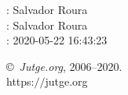 \documentclass[11pt]{article}
\begin{document}
    \newcommand{\SampleTwoCol}{\SampleTwoColInputOutput{sample-1}{1}\SampleTwoColInputOutput{sample-2}{2}}
    \newcommand{\SampleOneCol}{\SampleOneColInputOutput{sample-1}{1}\SampleOneColInputOutput{sample-2}{2}}

    \ProblemInformation
    \Author: Salvador Roura\\    \Translator: Salvador Roura\\
    \Generation: 2020-05-22 16:43:23

    \bigskip

    \copyright\ \emph{Jutge.org}, 2006--2020. \\
    https:$/\!\!/$jutge.org
\end{document}
